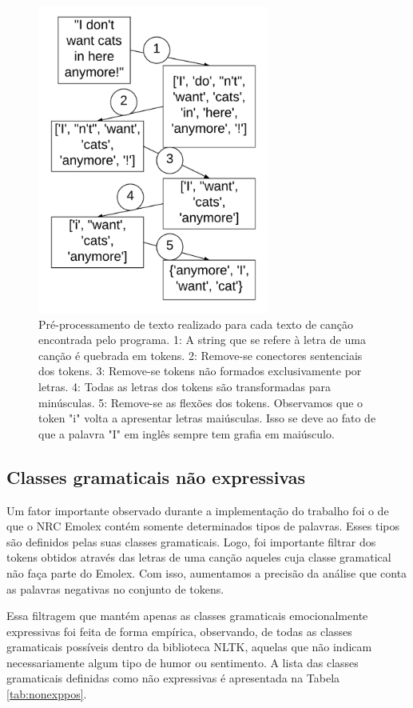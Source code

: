 \begin{figure}
\includegraphics[height=4in, width=3in]{textpre.png}
\caption{Pré-processamento de texto realizado para cada texto de canção
encontrada pelo programa. 1: A string que se refere à letra de uma canção
é quebrada em tokens. 2: Remove-se conectores sentenciais dos tokens.
3: Remove-se tokens não formados exclusivamente por letras. 4:
Todas as letras dos tokens são transformadas para minúsculas. 
5: Remove-se as flexões dos tokens. Observamos que o token "i" volta 
a apresentar letras maiúsculas. Isso se deve ao fato de que a palavra
"I" em inglês sempre tem grafia em maiúsculo.}
\label{fig:music-mood}
\end{figure}

\subsection{Classes gramaticais não expressivas} \label{subsec:pos}

Um fator importante observado durante a implementação do trabalho foi o de
que o NRC Emolex contém somente determinados tipos de palavras. Esses tipos
são definidos pelas suas classes gramaticais. Logo, foi importante filtrar
dos tokens obtidos através das letras de uma canção aqueles cuja classe
gramatical não faça parte do Emolex. Com isso, aumentamos a precisão da 
análise que conta as palavras negativas no conjunto de tokens. 

Essa filtragem que mantém apenas as classes gramaticais emocionalmente
expressivas foi feita de forma empírica, observando, de todas as classes
gramaticais possíveis dentro da biblioteca NLTK, aquelas que não indicam
necessariamente algum tipo de humor ou sentimento. A lista das classes
gramaticais definidas como não expressivas é apresentada na Tabela
\ref{tab:nonexppos}.

